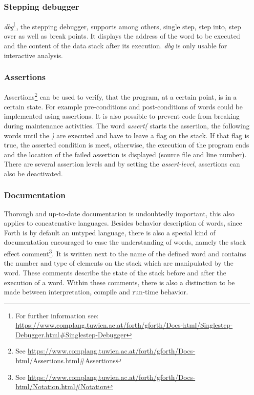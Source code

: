 \subsubsection*{Stepping debugger}
\emph{dbg}\footnote{For further information see: \url{https://www.complang.tuwien.ac.at/forth/gforth/Docs-html/Singlestep-Debugger.html\#Singlestep-Debugger}}, the stepping debugger, supports among others, single step, step into, step over as well as break points. It displays the address of the word to be executed and the content of the data stack after its execution. \emph{dbg} is only usable for interactive analysis.

\subsubsection*{Assertions}
Assertions\footnote{See \url{https://www.complang.tuwien.ac.at/forth/gforth/Docs-html/Assertions.html\#Assertions}} can be used to verify, that the program, at a certain point, is in a certain state. For example pre-conditions and post-conditions of words could be implemented using assertions. It is also possible to prevent code from breaking during maintenance activities. The word \emph{assert(} starts the assertion, the following words until the \emph{)} are executed and have to leave a flag on the stack. If that flag is true, the asserted condition is meet, otherwise, the execution of the program ends and the location of the failed assertion is displayed (source file and line number).\\
There are several assertion levels and by setting the \emph{assert-level}, assertions can also be deactivated.

\subsubsection*{Documentation}
Thorough and up-to-date documentation is undoubtedly important, this also applies to concatenative languages. Besides behavior description of words, since Forth is by default an untyped language, there is also a special kind of documentation encouraged to ease the understanding of words, namely the stack effect comment\footnote{See \url{https://www.complang.tuwien.ac.at/forth/gforth/Docs-html/Notation.html\#Notation}}. It is written next to the name of the defined word and contains the number and type of elements on the stack which are manipulated by the word. These comments describe the state of the stack before and after the execution of a word. Within these comments, there is also a distinction to be made between interpretation, compile and run-time behavior.

